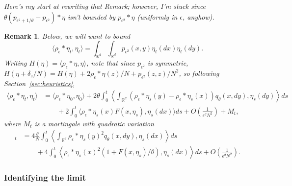 \documentclass[12pt]{article}
\newtheorem{remark}[theorem]{Remark}
\newcommand{\IR}{\mathbb R}
\newcommand{\comment}[1]{{\color{blue} \it #1}}
\begin{document}
\comment{Here's my start at rewriting that Remark;
    however, I'm stuck since $\theta(p_{\epsilon^2 + 1/\theta} - p_{\epsilon^2}) * \eta$
    isn't bounded by $p_{\epsilon^2} * \eta$ (uniformly in $\epsilon$, anyhow).
}

\begin{remark} \label{remark:BoundedIntegral2}
    Below, we will want to bound
    \[
        \langle \rho_\epsilon * \eta_t, \eta_t \rangle
        =
        \int_{\IR^d} \int_{\IR^d} p_{\epsilon^2}(x, y) \eta_t(dx) \eta_t(dy) .
    \]
    Writing $H(\eta) = \langle \rho_\epsilon * \eta, \eta \rangle$,
    note that since $p_{\epsilon^2}$ is symmetric,
    $H(\eta + \delta_z / N) = H(\eta) + 2 \rho_\epsilon * \eta(z) / N + p_{\epsilon^2}(z, z) / N^2$,
    so following Section~\ref{sec:heuristics},
    \begin{align*}
        \langle \rho_\epsilon * \eta_t, \eta_t \rangle
        &=
        \langle \rho_\epsilon * \eta_0, \eta_0 \rangle
        +
        2 \theta \int_0^t \left \langle \int_{\IR^d}
            \left(
               \rho_\epsilon * \eta_s(y)
               -
               \rho_\epsilon * \eta_s(x)
            \right)
            q_\theta(x, dy)
        , \eta_s(dy) \right \rangle ds
        \\ & \qquad {}
        +
        2 \int_0^t
        \langle
            \rho_\epsilon * \eta_s(x) F(x, \eta_s)
        , \eta_s(dx) \rangle
        ds
        +
        O\left( \frac{1}{\epsilon^d N^2} \right)
        + M_t ,
    \end{align*}
    where $M_t$ is a martingale with quadratic variation
    \begin{align*}
        [M]_t
        &=
        4 \frac{\theta}{N} \int_0^t
        \left \langle
            \int_{\IR^d}
                \rho_\epsilon * \eta_s(y)^2
            q_\theta(x, dy)
        , \eta_s(dx) \right\rangle
        ds
        \\ & \qquad {}
        +
        4 \int_0^t
        \left \langle
            \rho_\epsilon * \eta_s(x)^2 (1 + F(x, \eta_s) / \theta) 
        , \eta_s(dx) \right\rangle
        ds
        +
        O\left( \frac{1}{\epsilon^d N^2} \right) .
    \end{align*}
\end{remark}

\subsubsection{Identifying the limit}
\end{document}
